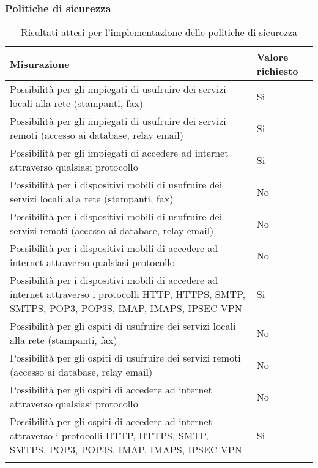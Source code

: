 \documentclass[Tesi.tex]{subfiles}
\begin{document}
\subsubsection{Politiche di sicurezza}
\label{table:Risultati attesi per l'implementazione delle politiche di sicurezza}
\renewcommand*{\arraystretch}{1.2}
\begin{longtable}[H]{p{9.5cm}p{3.4cm}}
	\rowcolor{CHeader}
	\color{CHeaderText} \textbf{Misurazione} & \color{CHeaderText} \textbf{Valore richiesto} \\
	\endhead
	Possibilità per gli impiegati di usufruire dei servizi locali alla rete (stampanti, fax) &
	Si \\
	Possibilità per gli impiegati di usufruire dei servizi remoti (accesso ai database, relay email) &
	Si \\
	Possibilità per gli impiegati di accedere ad internet attraverso qualsiasi protocollo &
	Si \\
	Possibilità per i dispositivi mobili di usufruire dei servizi locali alla rete (stampanti, fax) &
	No \\
	Possibilità per i dispositivi mobili di usufruire dei servizi remoti (accesso ai database, relay email) &
	No \\
	Possibilità per i dispositivi mobili di accedere ad internet attraverso qualsiasi protocollo &
	No \\
	Possibilità per i dispositivi mobili di accedere ad internet attraverso i protocolli HTTP, HTTPS, SMTP, SMTPS, POP3, POP3S, IMAP, IMAPS, IPSEC VPN &
	Si \\
	Possibilità per gli ospiti di usufruire dei servizi locali alla rete (stampanti, fax) &
	No \\
	Possibilità per gli ospiti di usufruire dei servizi remoti (accesso ai database, relay email) &
	No \\
	Possibilità per gli ospiti di accedere ad internet attraverso qualsiasi protocollo &
	No \\
	Possibilità per gli ospiti di accedere ad internet attraverso i protocolli HTTP, HTTPS, SMTP, SMTPS, POP3, POP3S, IMAP, IMAPS, IPSEC VPN &
	Si \\
	\hiderowcolors
	\caption{Risultati attesi per l'implementazione delle politiche di sicurezza}
\end{longtable}

\newpage
\end{document}
